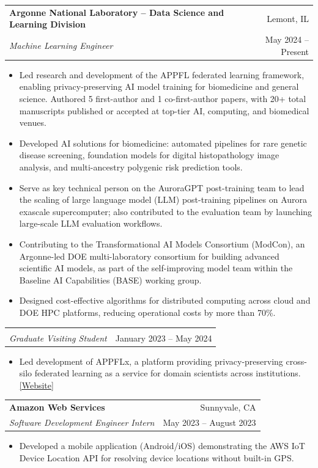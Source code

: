 \documentclass[letterpaper,11pt]{article}
\makeatletter
\newcommand{\CVSubheading}[4]{
  \vspace{-2pt}\item
    \begin{tabular*}{0.97\textwidth}[t]{l@{\extracolsep{\fill}}r}
      \textbf{#1} & #2 \\
      \small#3 & \small #4 \\
    \end{tabular*}\vspace{-7pt}
}
\makeatother
\begin{document}
\CVSubheading
{Argonne National Laboratory -- Data Science and Learning Division}{Lemont, IL}
{\textit{Machine Learning Engineer}}{May 2024 -- Present}
\begin{itemize}[leftmargin=0.5cm, label={$\bullet$}, topsep=2pt, itemsep=0pt]
  \small
  \item Led research and development of the APPFL federated learning framework, enabling privacy-preserving AI model training for biomedicine and general science. Authored 5 first-author and 1 co-first-author papers, with 20+ total manuscripts published or accepted at top-tier AI, computing, and biomedical venues.
  \item Developed AI solutions for biomedicine: automated pipelines for rare genetic disease screening, foundation models for digital histopathology image analysis, and multi-ancestry polygenic risk prediction tools.
  \item Serve as key technical person on the AuroraGPT post-training team to lead the scaling of large language model (LLM) post-training pipelines on Aurora exascale supercomputer; also contributed to the evaluation team by launching large-scale LLM evaluation workflows.
  \item Contributing to the Transformational AI Models Consortium (ModCon), an Argonne-led DOE multi-laboratory consortium for building advanced scientific AI models, as part of the self-improving model team within the Baseline AI Capabilities (BASE) working group.
  \item Designed cost-effective algorithms for distributed computing across cloud and DOE HPC platforms, reducing operational costs by more than 70\%.
\end{itemize}

\vspace{-18pt}
\CVSubheading
{{}}{{}}
{\textit{Graduate Visiting Student}}{January 2023 -- May 2024}
\begin{itemize}[leftmargin=0.5cm, label={$\bullet$}, topsep=2pt, itemsep=0pt]
  \small
  \item Led development of APPFLx, a platform providing privacy-preserving cross-silo federated learning as a service for domain scientists across institutions. \href{https://appflx.link/}{{[Website]}}
\end{itemize}

\CVSubheading
{Amazon Web Services}{Sunnyvale, CA}
{\textit{Software Development Engineer Intern}}{May 2023 -- August 2023}
\begin{itemize}[leftmargin=0.5cm, label={$\bullet$}, topsep=2pt, itemsep=0pt]
  \small
  \item Developed a mobile application (Android/iOS) demonstrating the AWS IoT Device Location API for resolving device locations without built-in GPS.
\end{itemize}
\end{document}
